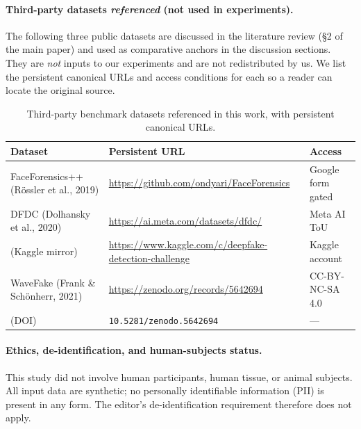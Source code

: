 \documentclass[11pt,a4paper]{article}
\begin{document}
\paragraph{Third-party datasets \emph{referenced} (not used in experiments).}
The following three public datasets are discussed in the literature
review (\S2 of the main paper) and used as comparative anchors in
the discussion sections. They are \emph{not} inputs to our
experiments and are not redistributed by us. We list the persistent
canonical URLs and access conditions for each so a reader can
locate the original source.

\begin{table}[!ht]\centering
\caption{Third-party benchmark datasets referenced in this work, with
persistent canonical URLs.}\label{tab:data-thirdparty}
\small
\setlength{\tabcolsep}{4pt}
\begin{tabular}{p{4.4cm} p{7.4cm} p{3.5cm}}
\toprule
Dataset & Persistent URL & Access \\
\midrule
FaceForensics++
(R\"ossler et al., 2019)
    & \url{https://github.com/ondyari/FaceForensics}
    & Google form gated \\
DFDC
(Dolhansky et al., 2020)
    & \url{https://ai.meta.com/datasets/dfdc/}
    & Meta AI ToU \\
\quad (Kaggle mirror)
    & \url{https://www.kaggle.com/c/deepfake-detection-challenge}
    & Kaggle account \\
WaveFake
(Frank \& Sch\"onherr, 2021)
    & \url{https://zenodo.org/records/5642694}
    & CC-BY-NC-SA 4.0 \\
\quad (DOI)
    & \texttt{10.5281/zenodo.5642694}
    & --- \\
\bottomrule
\end{tabular}
\end{table}

\paragraph{Ethics, de-identification, and human-subjects status.}
This study did not involve human participants, human tissue, or
animal subjects. All input data are synthetic; no personally
identifiable information (PII) is present in any form. The
editor's de-identification requirement therefore does not apply.

\end{document}
